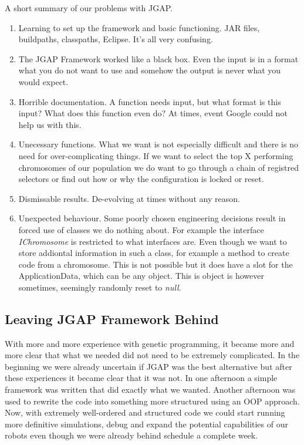 \documentclass[a4paper,10pt]{article}
\begin{document}
A short summary of our problems with JGAP.

\begin{enumerate}
    \item Learning to set up the framework and basic functioning. JAR files, buildpaths, classpaths, Eclipse. It's all very confusing.
    \item The JGAP Framework worked like a black box. Even the input is in a format what you do not want to use and somehow the output is never what you would expect. 
    \item Horrible documentation. A function needs input, but what format is this input? What does this function even do? At times, event Google could not help us 
    with this.
    \item Unecessary functions. What we want is not especially difficult and there is no need for over-complicating things. If we want to select the top X performing
    chromosomes of our population we do want to go through a chain of registred selectors or find out how or why the configuration is locked or reset. 
    \item Dismissable results. De-evolving at times without any reason.
    \item Unexpected behaviour. Some poorly chosen engineering decisions result in forced use of classes we do nothing about. For example the interface 
    \textit{IChromosome} is restricted to what interfaces are. Even though we want to store addiontal information in such a class, for example a method to create code
    from a chromosome. This is not possible but it does have a slot for the ApplicationData, which can be any object. This is object is however sometimes, seemingly
    randomly reset to \textit{null}.  
\end{enumerate}

\subsection{Leaving JGAP Framework Behind}
With more and more experience with genetic programming, it became more and more clear that what we needed did not need to be extremely complicated. In the beginning 
we were already uncertain if JGAP was the best alternative but after these experiences it became clear that it was not. In one afternoon a simple framework was written
that did exactly what we wanted. Another afternoon was used to rewrite the code into something more structured using an OOP approach. Now, with extremely well-ordered and
structured code we could start running more definitive simulations, debug and expand the potential capabilities of our robots even though we were already behind schedule
a complete week. \\
\end{document}

